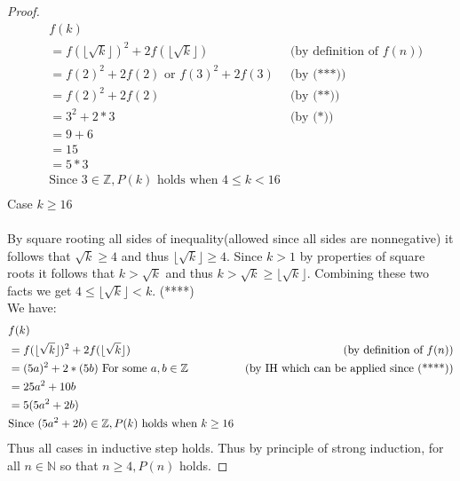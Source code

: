 \documentclass[12pt]{article}
\begin{document}
\begin{proof}
\begin{align*}
&f(k)\\
&= f(\lfloor\sqrt{k}\rfloor)^{2} + 2f(\lfloor\sqrt{k}\rfloor) &\text{(by definition of $f(n)$)}\\
& =f(2)^{2} + 2f(2) \text{ or } f(3)^{2} + 2f(3) &\text{(by (***))}\\
& =f(2)^{2} + 2f(2) &\text{(by (**))}\\
& = 3^2 + 2*3  &\text{(by (*))}\\
& = 9 + 6\\
& = 15\\
& = 5 * 3\\
&\text{Since $3 \in \mathbb{Z}, P(k)$ holds when $4\leq k<16$}\\
\end{align*}
Case $ k \geq 16$\\\\
By square rooting all sides of inequality(allowed since all sides are nonnegative) it follows that $\sqrt{k} \geq 4$ and thus $\lfloor\sqrt{k}\rfloor \geq 4$. Since $k > 1$ by properties of square roots it follows that $k > \sqrt{k}$ and thus $k > \sqrt{k} \geq  \lfloor\sqrt{k}\rfloor $. Combining these two facts we get $4 \leq   \lfloor\sqrt{k}\rfloor < k$. (****)
\\We have:
\begin{align*}
&f(k)\\
&= f(\lfloor\sqrt{k}\rfloor)^{2} + 2f(\lfloor\sqrt{k}\rfloor) &\text{(by definition of $f(n)$)}\\
& =(5a)^2 + 2*(5b) \text{ For some $a,b \in \mathbb{Z}$} &\text{(by IH which can be applied since (****))}\\
& =25a^2  + 10b\\
&= 5(5a^2 + 2b)\\
&\text{Since $(5a^2+2b) \in \mathbb{Z}, P(k)$ holds when $ k \geq 16$}\\
\end{align*}
Thus all cases in inductive step holds. Thus by principle of strong induction, for all $n \in \mathbb{N} $ so that $n \geq 4, P(n)$ holds.
\end{proof}
\end{document}
